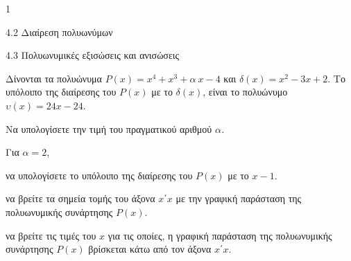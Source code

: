 \begin{ylh}{1}
\item 4.2 Διαίρεση πολυωνύμων
\item 4.3 Πολυωνυμικές εξισώσεις και ανισώσεις
\end{ylh}
Δίνονται τα πολυώνυμα $P(x) = x^{4} + x^{3} + \alpha\ x - 4$ και $\delta(x) = x^{2} - 3x + 2$. Το υπόλοιπο της διαίρεσης του $P(x)$ με το $\delta(x)$, είναι το πολυώνυμο $\upsilon(x) = 24x - 24$.
\begin{alist}
\item Να υπολογίσετε την τιμή του πραγματικού αριθμού $\alpha$\emph{.}
\item Για $\alpha = 2$,
\end{alist}
\begin{alist}
\item
  να υπολογίσετε το υπόλοιπο της διαίρεσης του $P(x)$ με το $x - 1.$
\end{alist}
\begin{alist}
\item
  να βρείτε τα σημεία τομής του άξονα $x΄x$ με την γραφική παράσταση της πολυωνυμικής συνάρτησης $P(x)$.
\end{alist}
\begin{alist}
\item
  να βρείτε τις τιμές του $x$ για τις οποίες, η γραφική παράσταση της πολυωνυμικής συνάρτησης $P(x)$ βρίσκεται κάτω από τον άξονα $x΄x$.
\end{alist}

